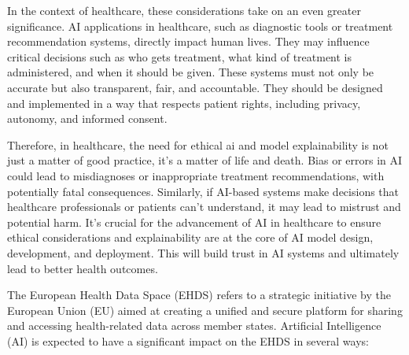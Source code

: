 In the context of healthcare, these considerations take on an even greater significance. AI applications in healthcare, such as diagnostic tools or treatment recommendation systems, directly impact human lives. They may influence critical decisions such as who gets treatment, what kind of treatment is administered, and when it should be given. These systems must not only be accurate but also transparent, fair, and accountable. They should be designed and implemented in a way that respects patient rights, including privacy, autonomy, and informed consent.

Therefore, in healthcare, the need for ethical \ac{ai} and model explainability is not just a matter of good practice, it's a matter of life and death. Bias or errors in AI could lead to misdiagnoses or inappropriate treatment recommendations, with potentially fatal consequences. Similarly, if AI-based systems make decisions that healthcare professionals or patients can't understand, it may lead to mistrust and potential harm. It's crucial for the advancement of AI in healthcare to ensure ethical considerations and explainability are at the core of AI model design, development, and deployment. This will build trust in AI systems and ultimately lead to better health outcomes.


The European Health Data Space (EHDS) refers to a strategic initiative by the European Union (EU) aimed at creating a unified and secure platform for sharing and accessing health-related data across member states. Artificial Intelligence (AI) is expected to have a significant impact on the EHDS in several ways:

